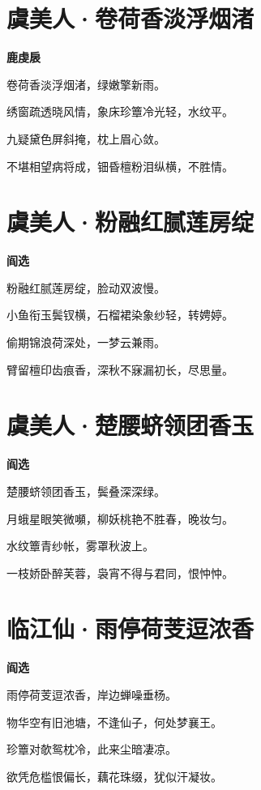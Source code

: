 \documentclass[12pt,a4paper]{ctexbook}
\begin{document}
\section{虞美人·卷荷香淡浮烟渚}
\textbf{鹿虔扆}\par\vspace{0.5em}
卷荷香淡浮烟渚，绿嫩擎新雨。\par
绣窗疏透晓风情，象床珍簟冷光轻，水纹平。\par
九疑黛色屏斜掩，枕上眉心敛。\par
不堪相望病将成，钿昏檀粉泪纵横，不胜情。\par

\section{虞美人·粉融红腻莲房绽}
\textbf{阎选}\par\vspace{0.5em}
粉融红腻莲房绽，脸动双波慢。\par
小鱼衔玉鬓钗横，石榴裙染象纱轻，转娉婷。\par
偷期锦浪荷深处，一梦云兼雨。\par
臂留檀印齿痕香，深秋不寐漏初长，尽思量。\par

\section{虞美人·楚腰蛴领团香玉}
\textbf{阎选}\par\vspace{0.5em}
楚腰蛴领团香玉，鬓叠深深绿。\par
月蛾星眼笑微嚬，柳妖桃艳不胜春，晚妆匀。\par
水纹簟青纱帐，雾罩秋波上。\par
一枝娇卧醉芙蓉，袅宵不得与君同，恨忡忡。\par

\section{临江仙·雨停荷芰逗浓香}
\textbf{阎选}\par\vspace{0.5em}
雨停荷芰逗浓香，岸边蝉噪垂杨。\par
物华空有旧池塘，不逢仙子，何处梦襄王。\par
珍簟对欹鸳枕冷，此来尘暗凄凉。\par
欲凭危槛恨偏长，藕花珠缀，犹似汗凝妆。\par
\end{document}

